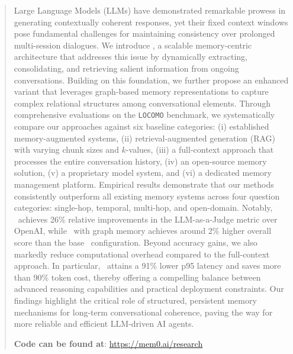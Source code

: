 \begin{abstract}

\vspace{1cm}

Large Language Models (LLMs) have demonstrated remarkable prowess in generating contextually coherent responses, yet their fixed context windows pose fundamental challenges for maintaining consistency over prolonged multi-session dialogues. We introduce \mem, a scalable memory-centric architecture that addresses this issue by dynamically extracting, consolidating, and retrieving salient information from ongoing conversations. Building on this foundation, we further propose an enhanced variant that leverages graph-based memory representations to capture complex relational structures among conversational elements.
Through comprehensive evaluations on the \texttt{LOCOMO} benchmark, we systematically compare our approaches against six baseline categories: (i) established memory-augmented systems, (ii) retrieval-augmented generation (RAG) with varying chunk sizes and
$k$-values, (iii) a full-context approach that processes the entire conversation history, (iv) an open-source memory solution, (v) a proprietary model system, and (vi) a dedicated memory management platform. 
Empirical results demonstrate that our methods consistently outperform all existing memory systems across four question categories: single-hop, temporal, multi-hop, and open-domain. 
Notably, \mem~achieves 26\% relative improvements in the LLM-as-a-Judge metric over OpenAI, while \mem~with graph memory achieves around 2\% higher overall score than the base \mem~configuration.
Beyond accuracy gains, we also markedly reduce computational overhead compared to the full-context approach. In particular, \mem~attains a 91\% lower p95 latency and saves more than 90\% token cost, thereby offering a compelling balance between advanced reasoning capabilities and practical deployment constraints.
Our findings highlight the critical role of structured, persistent memory mechanisms for long-term conversational coherence, paving the way for more reliable and efficient LLM-driven AI agents.

\vspace{5mm}
\textbf{Code can be found at}: \href{https://mem0.ai/research}{https://mem0.ai/research}



\end{abstract}